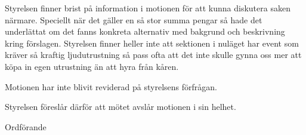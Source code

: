 \documentclass[../_main/handlingar.tex]{subfiles}
\begin{document}
\motionssvar
Styrelsen finner brist på information i motionen för att kunna diskutera saken närmare. Speciellt när det gäller en så stor summa pengar så hade det underlättat om det fanns konkreta alternativ
med bakgrund och beskrivning kring förslagen. Styrelsen finner heller inte att sektionen i nuläget har event som kräver så kraftig ljudutrustning så pass ofta att det inte skulle 
gynna oss mer att köpa in egen utrustning än att hyra från kåren.

Motionen har inte blivit reviderad på styrelsens förfrågan.

Styrelsen föreslår därför att mötet avslår motionen i sin helhet.

\begin{signatures}{1}
    \ist
    \signature{\ordf}{Ordförande}
\end{signatures}
\end{document}
